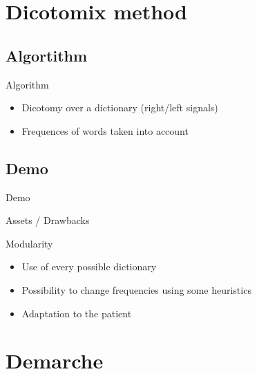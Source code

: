 \documentclass[notes]{beamer}
\begin{document}
\section{Dicotomix method}
\subsection{Algortithm}
\begin{frame}{Algorithm}
	\begin{center}
		\begin{itemize}
			\item Dicotomy over a dictionary (right/left signals)
			\item Frequences of words taken into account
		\end{itemize}
	\end{center}
\end{frame}

\subsection{Demo}
\begin{frame}{Demo}
	\begin{center}
	\end{center}
\end{frame}

\begin{frame}{Assets / Drawbacks}
	\begin{tcolorbox}[colback=green!5,colframe=green!40!black,title=A nice heading]
		
	\end{tcolorbox}
\end{frame}

\begin{frame}{Modularity}
	\begin{center}
		\begin{itemize}
			\item Use of every possible dictionary %
			\item Possibility to change frequencies using some heuristics
			\item Adaptation to the patient
		\end{itemize}
	\end{center}
\end{frame}

\section{Demarche}
\end{document}
